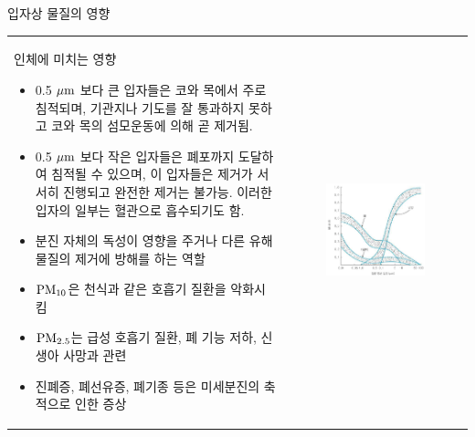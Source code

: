 \begin{frame}[t]{입자상 물질의 영향}
	\begin{tabular}{ll}
		\begin{minipage}[t]{0.5\textwidth}\scriptsize
			인체에 미치는 영향
			\begin{itemize}	
				\item 0.5 $\rm{\mu m}$ 보다 큰 입자들은 코와 목에서 주로 침적되며, 기관지나 기도를 잘 통과하지 못하고 코와 목의 섬모운동에 의해 곧 제거됨.
				\item 0.5 $\rm{\mu m}$ 보다 작은 입자들은 폐포까지 도달하여 침적될 수 있으며, 이 입자들은 제거가 서서히 진행되고 완전한 제거는 불가능. 이러한 입자의 일부는 혈관으로 흡수되기도 함.
				\item 분진 자체의 독성이 영향을 주거나 다른 유해물질의 제거에 방해를 하는 역할
				\item $\rm{{PM}_{10}}$은 천식과 같은 호흡기 질환을 악화시킴
				\item $\rm{{PM}_{2.5}}$는 급성 호흡기 질환, 폐 기능 저하, 신생아 사망과 관련
				\item 진폐증, 폐선유증, 폐기종 등은 미세분진의 축적으로 인한 증상
			\end{itemize}
			
		\end{minipage}	
		&
		\begin{minipage}[t]{0.45\textwidth}
			\begin{figure}[t]
				\includegraphics[width=\linewidth]{images/tsp.png}
			\end{figure}
			
		\end{minipage}
	\end{tabular}
\end{frame}




